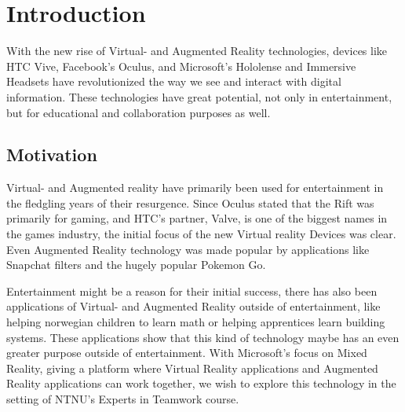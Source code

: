 \chapter{Introduction}
    With the new rise of Virtual- and Augmented Reality technologies, devices like HTC Vive, Facebook's Oculus, and Microsoft's Hololense and Immersive Headsets have revolutionized the way we see and interact with digital information. These technologies have great potential, not only in entertainment, but for educational and collaboration purposes as well.
    

    \section{Motivation}
        Virtual- and Augmented reality have primarily been used for entertainment in the fledgling years of their resurgence. Since Oculus stated that the Rift was primarily for gaming\cite{OculusMarkZuckerberg}, and HTC's partner, Valve, is one of the biggest names in the games industry\cite{ValveBigName}, the initial focus of the new Virtual reality Devices was clear. Even Augmented Reality technology was made popular by applications like Snapchat\cite{Snapchat} filters and the hugely popular Pokemon Go\cite{PokemonGo}.
        
        Entertainment might be a reason for their initial success, there has also been applications of Virtual- and Augmented Reality outside of entertainment, like helping norwegian children to learn math\cite{innomag2017} or helping apprentices learn building systems\cite{Nordbohus2017}. These applications show that this kind of technology maybe has an even greater purpose outside of entertainment. With Microsoft's focus on Mixed Reality, giving a platform where Virtual Reality applications and Augmented Reality applications can work together, we wish to explore this technology in the setting of NTNU's Experts in Teamwork
        course.
        
